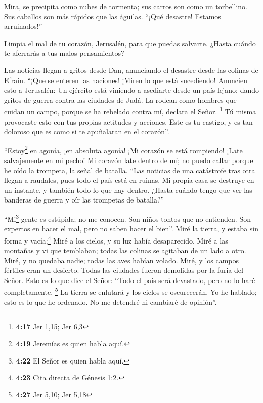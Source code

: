  Mira, se precipita como nubes de tormenta; sus carros
son como un torbellino. Sus caballos son más rápidos que las águilas.
``¡Qué desastre! Estamos arruinados!''

 Limpia el mal de tu corazón, Jerusalén, para que puedas
salvarte. ¿Hasta cuándo te aferrarás a tus malos pensamientos?

 Las noticias llegan a gritos desde Dan, anunciando el
desastre desde las colinas de Efraín.  ``¡Que se enteren
las naciones! ¡Miren lo que está sucediendo! Anuncien esto a Jerusalén:
Un ejército está viniendo a asediarte desde un país lejano; dando gritos
de guerra contra las ciudades de Judá.  La rodean como
hombres que cuidan un campo, porque se ha rebelado contra mí, declara el
Señor. \footnote{\textbf{4:17} Jer 1,15; Jer 6,3}  Tú
misma provocaste esto con tus propias actitudes y acciones. Este es tu
castigo, y es tan doloroso que es como si te apuñalaran en el corazón''.

 ``Estoy\footnote{\textbf{4:19} Jeremías es quien habla
  aquí.} en agonía, ¡en absoluta agonía! ¡Mi corazón se está rompiendo!
¡Late salvajemente en mi pecho! Mi corazón late dentro de mí; no puedo
callar porque he oído la trompeta, la señal de batalla. 
``Las noticias de una catástrofe tras otra llegan a raudales, pues todo
el país está en ruinas. Mi propia casa se destruye en un instante, y
también todo lo que hay dentro.  ¿Hasta cuándo tengo que
ver las banderas de guerra y oír las trompetas de batalla?''

 ``Mi\footnote{\textbf{4:22} El Señor es quien habla
  aquí.} gente es estúpida; no me conocen. Son niños tontos que no
entienden. Son expertos en hacer el mal, pero no saben hacer el bien''.
 Miré la tierra, y estaba sin forma y vacía;\footnote{\textbf{4:23}
  Cita directa de Génesis 1:2.} Miré a los cielos, y su luz había
desaparecido.  Miré a las montañas y vi que temblaban;
todas las colinas se agitaban de un lado a otro.  Miré, y
no quedaba nadie; todas las aves habían volado.  Miré, y
los campos fértiles eran un desierto. Todas las ciudades fueron
demolidas por la furia del Señor.  Esto es lo que dice el
Señor: ``Todo el país será devastado, pero no lo haré completamente.
\footnote{\textbf{4:27} Jer 5,10; Jer 5,18}  La tierra se
enlutará y los cielos se oscurecerán. Yo he hablado; esto es lo que he
ordenado. No me detendré ni cambiaré de opinión''.

